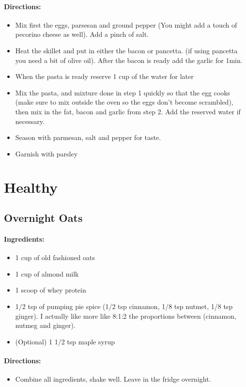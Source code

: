 \documentclass{article}
\begin{document}
\paragraph{Directions:}
\begin{itemize}
	\item Mix first the eggs, parsesan and ground pepper (You might add a touch of pecorino cheese as well). Add a pinch of salt.
	\item Heat the skillet and put in either the bacon or pancetta. (if using pancetta you need a bit of olive oil). After the bacon is ready add the garlic for 1min.
	\item When the pasta is ready reserve 1 cup of the water for later
	\item Mix the pasta, and mixture done in step 1 quickly so that the egg cooks (make sure to mix outside the oven so the eggs don’t become scrambled), then mix in the fat, bacon and garlic from step 2. Add the reserved water if necessary.
	\item Season with parmesan, salt and pepper for taste.
	\item Garnish with parsley
\end{itemize}

\section{Healthy}

\subsection{Overnight Oats}

\paragraph{Ingredients:}

\begin{itemize}
	\item 1 cup of old fashioned oats
	\item 1 cup of almond milk
	\item 1 scoop of whey protein
	\item 1/2 tsp of pumping pie spice (1/2 tsp cinnamon, 1/8 tsp nutmet, 1/8 tsp ginger). I actually like more like 8:1:2 the proportions between (cinnamon, nutmeg and ginger).
	\item (Optional) 1 1/2 tsp maple syrup
\end{itemize}

\paragraph{Directions:}
\begin{itemize}
	\item Combine all ingredients, shake well. Leave in the fridge overnight.
\end{itemize}
\end{document}
